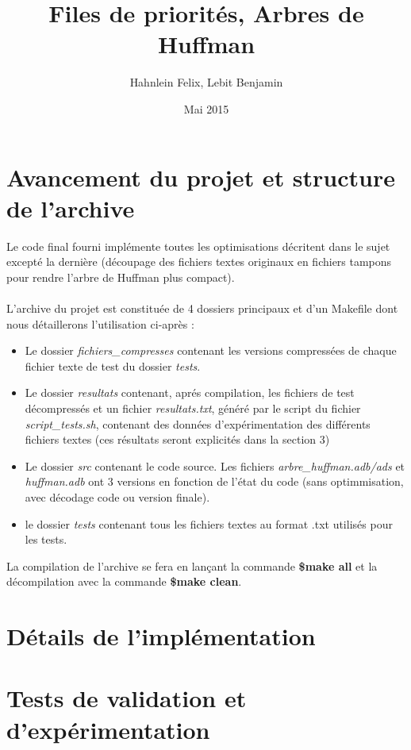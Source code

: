 \documentclass[a4paper,11pt]{article}
\title{Files de priorités, Arbres de Huffman}
\author{Hahnlein Felix, Lebit Benjamin}
\date{Mai 2015}
\begin{document}
\maketitle

\section{Avancement du projet et structure de l'archive}
Le code final fourni implémente toutes les optimisations décritent dans le sujet excepté la dernière (découpage des fichiers textes originaux en fichiers tampons pour rendre l'arbre de Huffman plus compact). \\\\
L'archive du projet est constituée de 4 dossiers principaux et d'un Makefile dont nous détaillerons l'utilisation ci-après :
\begin{itemize}
\item Le dossier \textit{fichiers\_compresses} contenant les versions compressées de chaque fichier texte de test du dossier \textit{tests}.
\item Le dossier \textit{resultats} contenant, aprés compilation, les fichiers de test décompressés et un fichier \textit{resultats.txt}, généré par le script du fichier\textit{ script\_tests.sh}, contenant des données d'expérimentation des différents fichiers textes (ces résultats seront explicités dans la section 3)
\item Le dossier \textit{src} contenant le code source. Les fichiers \textit{arbre\_huffman.adb/ads} et \textit{huffman.adb} ont 3 versions en fonction de l'état du code (sans optimmisation, avec décodage code ou version finale).
\item le dossier \textit{tests} contenant tous les fichiers textes au format .txt utilisés pour les tests.
\end{itemize}
La compilation de l'archive se fera en lançant la commande \scriptsize{\textbf{\$make all}} \normalsize{ et la décompilation avec la commande }\scriptsize{\textbf{\$make clean}}.
\section{Détails de l'implémentation}

\section{Tests de validation et d'expérimentation} 
\end{document}
